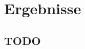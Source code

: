 \newpage
\slidetitle{}
\section{Ergebnisse}


\begin{center}
\end{center}

\newpage
{}
\subsection{TODO}

